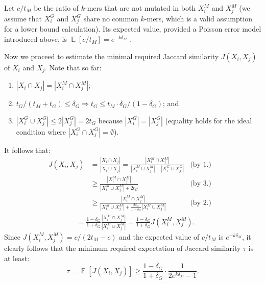 \documentclass{article}
\DeclareMathOperator{\E}{\mathbb{E}}
\begin{document}
Let $c/t_M$ be the ratio of $k$-mers that are not mutated in both $X^M_i$ and $X^M_j$ (we assume that $X^G_i$ and $X^G_j$ share no common $k$-mers, which is a valid assumption for a lower bound calculation). Its expected value, provided a Poisson error model introduced above, is $\E[c/t_M] = e^{-k \delta_M}$ \citep{Jain2017a}.  

Now we proceed to estimate the minimal required Jaccard similarity $J(X_i, X_j)$ of $X_i$ and $X_j$. Note that so far:
\begin{enumerate}
\item $|X_i \cap X_j|=|X^M_i \cap X^M_j|$; 
\item $t_G/(t_M+t_G) \leq \delta_G \Rightarrow t_G \leq t_M \cdot \delta_G/(1-\delta_G)$; and
\item $|X^G_i \cup X^G_j| \leq 2|X^G_j| = 2 t_G$ because $|X^G_i|=|X^G_j|$ (equality holds for the ideal condition where $|X^G_i \cap X^G_j|=\emptyset$).
\end{enumerate}
It follows that:
\begin{align*}
J(X_i,X_j) 
    &= \frac{|X_i\cap X_j|}{|X_i \cup X_j|} =
	       \frac{|X^M_i\cap X^M_j|}{|X^M_i\cup X^M_j| + |X^G_i\cup X^G_j|} & \text{(by 1.)} & \\
	& \geq  \frac{|X^M_i\cap X^M_j|}{|X^M_i\cup X^M_j| + 2t_G} & \text {(by 3.)}  \\
    &\geq  \frac{|X^M_i\cap X^M_j|}{|X^M_i\cup X^M_j| + 
    			\frac{2 \delta_G}{1-\delta_G} |X^M_i\cup X^M_j|} & \text{(by 2.)} 
\end{align*}
\begin{align*}
       & &=     \frac{1-\delta_G}{1+\delta_G} \frac{|X^M_i\cap X^M_j|}{|X^M_i\cup X^M_j|} = \frac{1-\delta_G}{1+\delta_G} J(X^M_i, X^M_j). &
\end{align*}
Since $J(X^M_i, X^M_j)=c/(2t_M-c)$ and the expected value of $c/t_M$ is $e^{-k \delta_M}$, it clearly follows that the minimum required expectation of Jaccard similarity $\tau$ is at least:
$$
\tau = \E[J(X_i,X_j)] \geq \frac{1-\delta_G}{1+\delta_G} \cdot \frac{1}{2e^{k\delta_M}-1}.
$$
\end{document}
